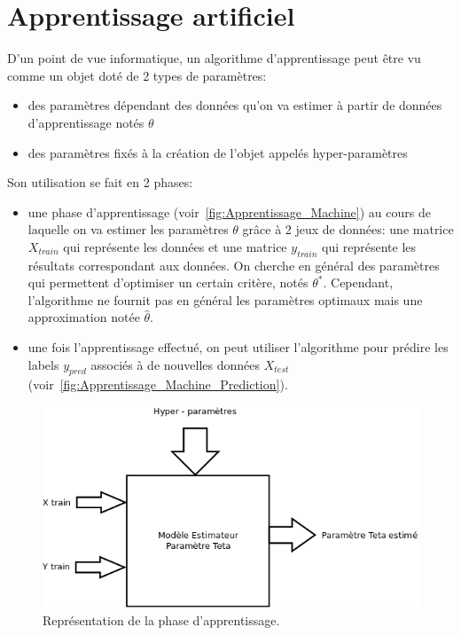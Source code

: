 \section{Apprentissage artificiel}


D'un point de vue informatique, un algorithme d'apprentissage peut être vu comme un objet doté de 2 types de paramètres:
\begin{itemize}
 \item des paramètres dépendant des données qu'on va estimer à partir de données d'apprentissage notés $\theta$
 \item des paramètres fixés à la création de l'objet appelés hyper-paramètres
\end{itemize}
Son utilisation se fait en 2 phases:
\begin{itemize}
 \item une phase d'apprentissage (voir~\autoref{fig:Apprentissage_Machine}) au cours de laquelle on va estimer les paramètres $\theta$ grâce à 2 jeux de données:
       une matrice $X_{train}$ qui représente les données et une matrice $y_{train}$ qui représente les résultats correspondant aux données.
       On cherche en général des paramètres qui permettent d'optimiser un certain critère, notés $\theta^{*}$.
       Cependant, l'algorithme ne fournit pas en général les paramètres optimaux mais une approximation notée $\hat{\theta}$.

 \item une fois l'apprentissage effectué, on peut utiliser l'algorithme pour prédire les labels $y_{pred}$ associés à de nouvelles données $X_{test}$ (voir~\autoref{fig:Apprentissage_Machine_Prediction}).
\end{itemize}

\begin{figure}[htpb]
	\centering
	\includegraphics[scale = 0.25]{images/Diagramme1}
	\caption{Représentation de la phase d'apprentissage.}
	\label{fig:Apprentissage_Machine}
\end{figure}


